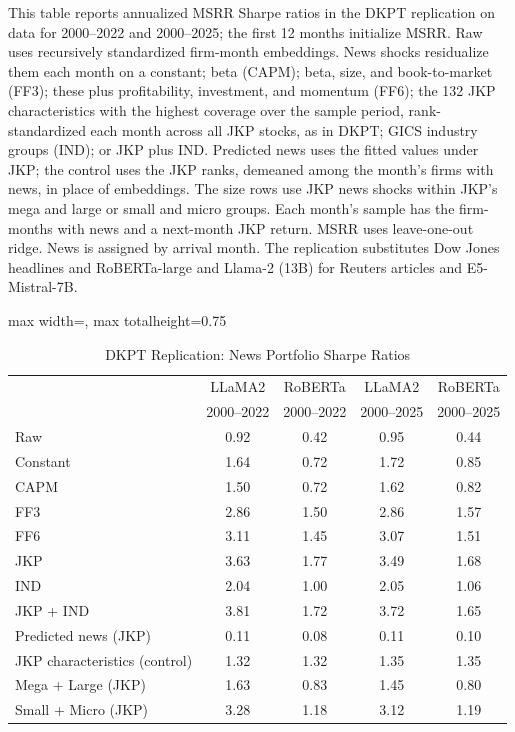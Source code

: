 \begin{table}[htbp]
\centering
\caption{DKPT Replication: News Portfolio Sharpe Ratios}
\label{tab:tabR6_did_msrr}
\begin{minipage}{\linewidth}\footnotesize
This table reports annualized MSRR Sharpe ratios in the DKPT replication on data for 2000--2022 and 2000--2025; the first 12 months initialize MSRR. Raw uses recursively standardized firm-month embeddings. News shocks residualize them each month on a constant; beta (CAPM); beta, size, and book-to-market (FF3); these plus profitability, investment, and momentum (FF6); the 132 JKP characteristics with the highest coverage over the sample period, rank-standardized each month across all JKP stocks, as in DKPT; GICS industry groups (IND); or JKP plus IND. Predicted news uses the fitted values under JKP; the control uses the JKP ranks, demeaned among the month's firms with news, in place of embeddings. The size rows use JKP news shocks within JKP's mega and large or small and micro groups. Each month's sample has the firm-months with news and a next-month JKP return. MSRR uses leave-one-out ridge. News is assigned by arrival month. The replication substitutes Dow Jones headlines and RoBERTa-large and Llama-2 (13B) for Reuters articles and E5-Mistral-7B.
\end{minipage}
\medskip

{\footnotesize
\begin{adjustbox}{max width=\linewidth, max totalheight=0.75\textheight}
\begin{tabular}{lcccc}
\toprule
 & LLaMA2 & RoBERTa & LLaMA2 & RoBERTa \\
 & 2000--2022 & 2000--2022 & 2000--2025 & 2000--2025 \\
\midrule
Raw & 0.92 & 0.42 & 0.95 & 0.44 \\
Constant & 1.64 & 0.72 & 1.72 & 0.85 \\
CAPM & 1.50 & 0.72 & 1.62 & 0.82 \\
FF3 & 2.86 & 1.50 & 2.86 & 1.57 \\
FF6 & 3.11 & 1.45 & 3.07 & 1.51 \\
JKP & 3.63 & 1.77 & 3.49 & 1.68 \\
IND & 2.04 & 1.00 & 2.05 & 1.06 \\
JKP + IND & 3.81 & 1.72 & 3.72 & 1.65 \\
Predicted news (JKP) & 0.11 & 0.08 & 0.11 & 0.10 \\
JKP characteristics (control) & 1.32 & 1.32 & 1.35 & 1.35 \\
Mega + Large (JKP) & 1.63 & 0.83 & 1.45 & 0.80 \\
Small + Micro (JKP) & 3.28 & 1.18 & 3.12 & 1.19 \\
\bottomrule
\end{tabular}
\end{adjustbox}
}
\end{table}
